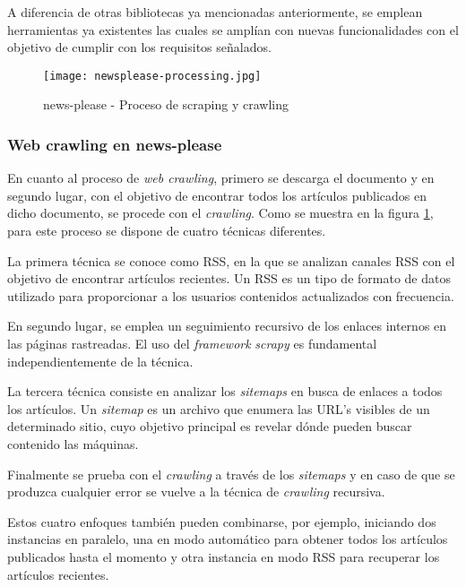 A diferencia de otras bibliotecas ya mencionadas anteriormente, se emplean herramientas ya existentes las 
cuales se amplían con nuevas funcionalidades con el objetivo de cumplir con los requisitos señalados.

\begin{figure}[tphb]
  \centering
  \texttt{[image: newsplease-processing.jpg]}
  \caption{news-please - Proceso de scraping y crawling}
  \label{img:news-please - proceso de scraping y crawling}
\end{figure}

\subsubsection{Web crawling en news-please}
\label{subsubsec:web crawling en news-please}

En cuanto al proceso de \emph{web crawling}, primero se descarga el documento y en segundo lugar, con el 
objetivo de encontrar todos los artículos publicados en dicho documento, se procede con el \emph{crawling}. 
Como se muestra en la figura \ref{img:news-please - proceso de scraping y crawling}, para este proceso se 
dispone de cuatro técnicas diferentes.

La primera técnica se conoce como RSS, en la que se analizan canales RSS con el objetivo de encontrar 
artículos recientes. Un RSS \cite{rss-sitemaps} es un tipo de formato de datos utilizado para proporcionar 
a los usuarios contenidos actualizados con frecuencia.

En segundo lugar, se emplea un seguimiento recursivo de los enlaces internos en las páginas rastreadas.
El uso del \emph{framework} \emph{scrapy} es fundamental independientemente de la técnica.

La tercera técnica consiste en analizar los \emph{sitemaps} en busca de enlaces a todos los artículos. Un 
\emph{sitemap} \cite{rss-sitemaps} es un archivo que enumera las URL's visibles de un determinado sitio, 
cuyo objetivo principal es revelar dónde pueden buscar contenido las máquinas.

Finalmente se prueba con el \emph{crawling} a través de los \emph{sitemaps} y en caso de que se produzca 
cualquier error se vuelve a la técnica de \emph{crawling} recursiva.

Estos cuatro enfoques también pueden combinarse, por ejemplo, iniciando dos instancias en paralelo, una en 
modo automático para obtener todos los artículos publicados hasta el momento y otra instancia en modo RSS 
para recuperar los artículos recientes.


